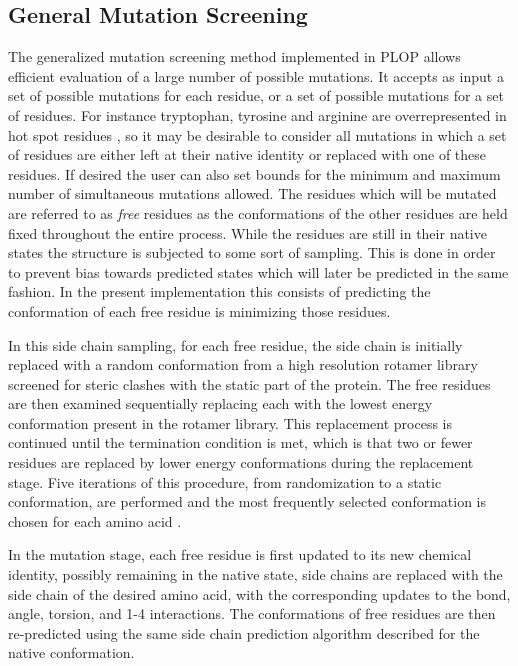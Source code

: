 \subsection{General Mutation Screening}
The generalized mutation screening method implemented in PLOP allows efficient evaluation of a large number of possible mutations.
It accepts as input a set of possible mutations for each residue, or a set of possible mutations for a set of residues.
For instance tryptophan, tyrosine and arginine are overrepresented in hot spot residues \cite{hu2000conservation}, so it may be desirable to consider all mutations in which a set of residues are either left at their native identity or replaced with one of these residues.
If desired the user can also set bounds for the minimum and maximum number of simultaneous mutations allowed.
The residues which will be mutated are referred to as {\it free} residues as the conformations of the other residues are held fixed throughout the entire process.
While the residues are still in their native states the structure is subjected to some sort of sampling.
This is done in order to prevent bias towards predicted states which will later be predicted in the same fashion.
In the present implementation this consists of predicting the conformation of each free residue is minimizing those residues.

In this side chain sampling, for each free residue, the side chain is initially replaced with a random conformation from a high resolution rotamer library screened for steric clashes with the static part of the protein.
The free residues are then examined sequentially replacing each with the lowest energy conformation present in the rotamer library.
This replacement process is continued until the termination condition is met, which is that two or fewer residues are replaced by lower energy conformations during the replacement stage.
Five iterations of this procedure, from randomization to a static conformation, are performed and the most frequently selected conformation is chosen for each amino acid \cite{jacobson2002force,jacobson2002role}.

In the mutation stage, each free residue is first updated to its new chemical identity, possibly remaining in the native state, side chains are replaced with the side chain of the desired amino acid, with the corresponding updates to the bond, angle, torsion, and 1-4 interactions.
The conformations of free residues are then re-predicted using the same side chain prediction algorithm described for the native conformation.

